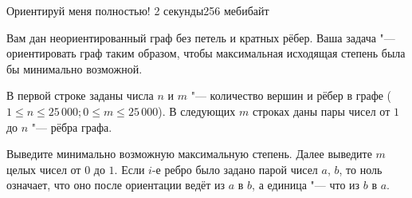 %
%
%

\begin{problem}{Ориентируй меня полностью!}{}{}
{2 секунды}{256 мебибайт}{}

Вам дан неориентированный граф без петель и кратных рёбер.
Ваша задача "--- ориентировать граф таким образом, чтобы
максимальная исходящая степень была бы минимально возможной.
                                                                                    
\InputFile

В первой строке заданы числа $n$ и $m$ "--- количество вершин и рёбер в графе
($1 \le n \le 25\,000; 0 \le m \le 25\,000$).
В следующих $m$ строках даны пары чисел от $1$ до $n$ "--- рёбра графа.

\OutputFile

Выведите минимально возможную максимальную степень.
Далее выведите $m$ целых чисел от $0$ до $1$.
Если $i$-е ребро было задано парой чисел $a$, $b$, то ноль означает,
что оно после ориентации ведёт из $a$ в $b$, а единица "--- что из $b$ в $a$.

\Examples

\begin{example}
%
%
\end{example}

\end{problem}
